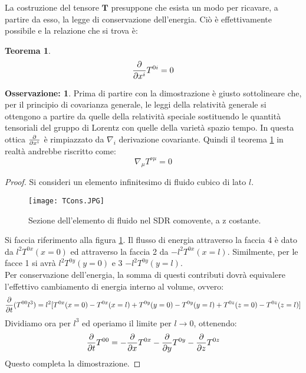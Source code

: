 \documentclass[]{report}
\theoremstyle{definition}
\theoremstyle{Theorem}
\newtheorem{Theo}[Def]{Teorema}
\theoremstyle{definition}
\theoremstyle{definition}
\theoremstyle{definition}
\newtheorem{Obs}[Def]{Osservazione:}
\begin{document}
La costruzione del tensore $\textbf{T}$ presuppone che esista un modo per ricavare, a partire da esso, la legge di conservazione dell'energia. Ciò è effettivamente possibile e la relazione che si trova è:
\begin{Theo} \label{Teo 2}
	$${\partial \over \partial x^i}T^{0i}=0$$	
\end{Theo}
\begin{Obs}
Prima di partire con la dimostrazione è giusto sottolineare che, per il principio di covarianza generale, le leggi della relatività generale si ottengono a partire da quelle della relatività speciale sostituendo le quantità tensoriali del gruppo di Lorentz con quelle della varietà spazio tempo. In questa ottica ${\partial \over \partial x^i}$ è rimpiazzato da $\nabla_i$ derivazione covariante. Quindi il teorema \ref{Teo 2} in realtà andrebbe riscritto come:
$$\nabla_\mu T^{\nu\mu}=0$$
\end{Obs}
\begin{proof}
	Si consideri un elemento infinitesimo di fluido cubico di lato $l$.
	\begin{figure} [H]
		\centering
		\label{Image 2}
		\texttt{[image: TCons.JPG]}
		\caption{Sezione dell'elemento di fluido nel SDR comovente, a z costante.}	
	\end{figure}
Si faccia riferimento alla figura \ref{Image 2}. Il flusso di energia attraverso la faccia 4 è dato da $l^2T^{0x}(x=0)$ ed attraverso la faccia 2 da $-l^2T^{0x}(x=l)$. Similmente, per le facce 1 si avrà $l^2T^{0y}(y=0)$ e 3 $-l^2T^{0y}(y=l)$.\\
Per conservazione dell'energia, la somma di questi contributi dovrà equivalere l'effettivo cambiamento di energia interno al volume, ovvero:
$${\partial \over \partial t}(T^{00}l^3)=l^2[T^{0x}(x=0)-T^{0x}(x=l)+T^{0y}(y=0)-T^{0y}(y=l)+T^{0z}(z=0)-T^{0z}(z=l)]$$
Dividiamo ora per $l^3$ ed operiamo il limite per $l\rightarrow 0$, ottenendo:
$${\partial \over \partial t}T^{00}=-{\partial \over \partial x}T^{0x}-{\partial \over \partial y}T^{0y}-{\partial \over \partial z}T^{0z}$$
Questo completa la dimostrazione.
\end{proof}
\end{document}
